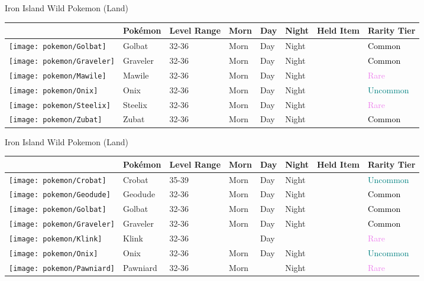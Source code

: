 \caption{Iron Island Wild Pokemon (Land)}%
\begin{longtable}{||l l l l l l l l||}%
\hline%
&Pokémon&Level Range&Morn&Day&Night&Held Item&Rarity Tier\\%
\hline%
\endhead%
\hline%
\texttt{[image: pokemon/Golbat]}&Golbat&32{-}36&Morn&Day&Night&&\textcolor{black}{%
Common%
}\\%
\hline%
\texttt{[image: pokemon/Graveler]}&Graveler&32{-}36&Morn&Day&Night&&\textcolor{black}{%
Common%
}\\%
\hline%
\texttt{[image: pokemon/Mawile]}&Mawile&32{-}36&Morn&Day&Night&&\textcolor{violet}{%
Rare%
}\\%
\hline%
\texttt{[image: pokemon/Onix]}&Onix&32{-}36&Morn&Day&Night&&\textcolor{teal}{%
Uncommon%
}\\%
\hline%
\texttt{[image: pokemon/Steelix]}&Steelix&32{-}36&Morn&Day&Night&&\textcolor{violet}{%
Rare%
}\\%
\hline%
\texttt{[image: pokemon/Zubat]}&Zubat&32{-}36&Morn&Day&Night&&\textcolor{black}{%
Common%
}\\%
\hline%
\end{longtable}%
\caption{Iron Island Wild Pokemon (Land)}%
\begin{longtable}{||l l l l l l l l||}%
\hline%
&Pokémon&Level Range&Morn&Day&Night&Held Item&Rarity Tier\\%
\hline%
\endhead%
\hline%
\texttt{[image: pokemon/Crobat]}&Crobat&35{-}39&Morn&Day&Night&&\textcolor{teal}{%
Uncommon%
}\\%
\hline%
\texttt{[image: pokemon/Geodude]}&Geodude&32{-}36&Morn&Day&Night&&\textcolor{black}{%
Common%
}\\%
\hline%
\texttt{[image: pokemon/Golbat]}&Golbat&32{-}36&Morn&Day&Night&&\textcolor{black}{%
Common%
}\\%
\hline%
\texttt{[image: pokemon/Graveler]}&Graveler&32{-}36&Morn&Day&Night&&\textcolor{black}{%
Common%
}\\%
\hline%
\texttt{[image: pokemon/Klink]}&Klink&32{-}36&&Day&&&\textcolor{violet}{%
Rare%
}\\%
\hline%
\texttt{[image: pokemon/Onix]}&Onix&32{-}36&Morn&Day&Night&&\textcolor{teal}{%
Uncommon%
}\\%
\hline%
\texttt{[image: pokemon/Pawniard]}&Pawniard&32{-}36&Morn&&Night&&\textcolor{violet}{%
Rare%
}\\%
\hline%
\end{longtable}%
